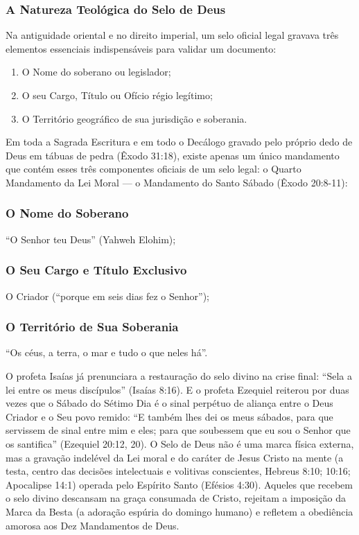 \subsubsection*{A Natureza Teológica do Selo de Deus}
Na antiguidade oriental e no direito imperial, um selo oficial legal gravava três elementos essenciais indispensáveis para validar um documento:
\begin{enumerate}
  \item O Nome do soberano ou legislador;
  \item O seu Cargo, Título ou Ofício régio legítimo;
  \item O Território geográfico de sua jurisdição e soberania.
\end{enumerate}


Em toda a Sagrada Escritura e em todo o Decálogo gravado pelo próprio dedo de Deus em tábuas de pedra (Êxodo 31:18), existe apenas um único mandamento que contém esses três componentes oficiais de um selo legal: o Quarto Mandamento da Lei Moral — o Mandamento do Santo Sábado (Êxodo 20:8-11):

\subsubsection*{O Nome do Soberano}
``O Senhor teu Deus'' (Yahweh Elohim);

\subsubsection*{O Seu Cargo e Título Exclusivo}
O Criador (``porque em seis dias fez o Senhor'');

\subsubsection*{O Território de Sua Soberania}
``Os céus, a terra, o mar e tudo o que neles há''.

O profeta Isaías já prenunciara a restauração do selo divino na crise final: ``Sela a lei entre os meus discípulos'' (Isaías 8:16). E o profeta Ezequiel reiterou por duas vezes que o Sábado do Sétimo Dia é o sinal perpétuo de aliança entre o Deus Criador e o Seu povo remido: ``E também lhes dei os meus sábados, para que servissem de sinal entre mim e eles; para que soubessem que eu sou o Senhor que os santifica'' (Ezequiel 20:12, 20).
O Selo de Deus não é uma marca física externa, mas a gravação indelével da Lei moral e do caráter de Jesus Cristo na mente (a testa, centro das decisões intelectuais e volitivas conscientes, Hebreus 8:10; 10:16; Apocalipse 14:1) operada pelo Espírito Santo (Efésios 4:30). Aqueles que recebem o selo divino descansam na graça consumada de Cristo, rejeitam a imposição da Marca da Besta (a adoração espúria do domingo humano) e refletem a obediência amorosa aos Dez Mandamentos de Deus.


